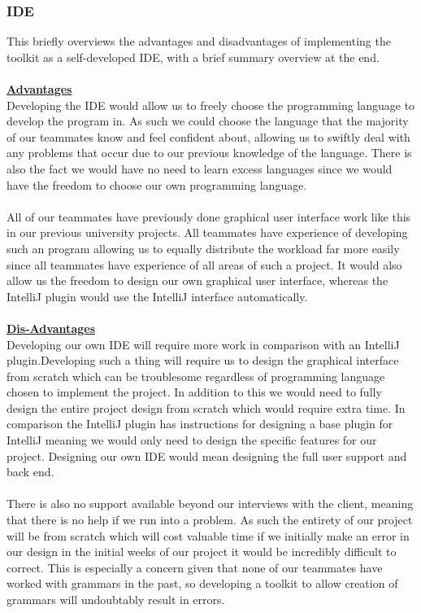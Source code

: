 \documentclass{l3proj}
\begin{document}
\subsubsection{IDE}
This briefly overviews the advantages and disadvantages of implementing the toolkit as a self-developed IDE, with a brief summary overview at the end.\\
\\
 \textbf {\underline{Advantages}}\\
Developing the IDE would allow us to freely choose the programming language to develop the program in. As such we could choose the language that the majority of our teammates know and feel confident about, allowing us to swiftly deal with any problems that occur due to our previous knowledge of the language. There is also the fact we would have no need to learn excess languages since we would have the freedom to choose our own programming language. \\
\\ 
All of our teammates have previously done graphical user interface work like this in our previous university projects. All teammates have experience of developing such an program allowing us to equally distribute the workload far more easily since all teammates have experience of all areas of such a project. It would also allow us the freedom to design our own graphical user interface, whereas the IntelliJ plugin would use the IntelliJ interface automatically.\\
\\
 \textbf {\underline{Dis-Advantages}}\\
Developing our own IDE will require more work in comparison with an IntelliJ plugin.Developing such a thing will require us to design the graphical interface from scratch which can be troublesome regardless of programming language chosen to implement the project. In addition to this we would need to fully design the entire project design from scratch which would require extra time. In comparison the IntelliJ plugin has instructions for designing a base plugin for IntelliJ meaning we would only need to design the specific features for our project. Designing our own IDE would mean designing the full user support and back end.\\
\\
There is also no support available beyond our interviews with the client, meaning that there is no help if we run into a problem. As such the entirety of our project will be from scratch which will cost valuable time if we initially make an error in our design in the initial weeks of our project it would be incredibly difficult to correct. This is especially a concern given that none of our teammates have worked with grammars in the past, so developing a toolkit to allow creation of grammars will undoubtably result in errors.\\
\end{document}
